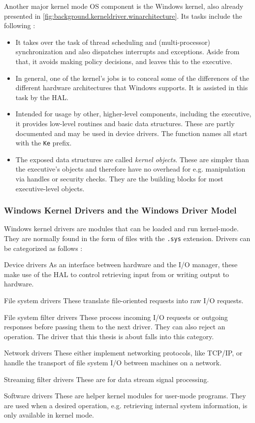 Another major kernel mode OS component is the Windows kernel, also already presented in \autoref{fig:background.kerneldriver.winarchitecture}. Its tasks include the following \cite{Yosifovich2017}:
\begin{itemize}
	\item It takes over the task of thread scheduling and (multi-processor) synchronization and also dispatches interrupts and exceptions. Aside from that, it avoids making policy decisions, and leaves this to the executive.
	\item In general, one of the kernel's jobs is to conceal some of the differences of the different hardware architectures that Windows supports. It is assisted in this task by the HAL.
	\item Intended for usage by other, higher-level components, including the executive, it provides low-level routines and basic data structures. These are partly documented and may be used in device drivers. The function names all start with the \texttt{Ke} prefix.
	\item The exposed data structures are called \emph{kernel objects}. These are simpler than the executive's objects and therefore have no overhead for e.g. manipulation via handles or security checks. They are the building blocks for most executive-level objects.
\end{itemize}

\subsubsection{Windows Kernel Drivers and the Windows Driver Model}
\label{chap:background.kerneldriver.wdm}
Windows kernel drivers are modules that can be loaded and run kernel-mode. They are normally found in the form of files with the \texttt{.sys} extension. Drivers can be categorized as follows \cite{Yosifovich2017}:
\begin{descitemize}
	\item[Device drivers] As an interface between hardware and the I/O manager, these make use of the HAL to control retrieving input from or writing output to hardware.
	\item[File system drivers] These translate file-oriented requests into raw I/O requests.
	\item[File system filter drivers] These process incoming I/O requests or outgoing responses before passing them to the next driver. They can also reject an operation. The driver that this thesis is about falls into this category.
	\item[Network drivers] These either implement networking protocols, like TCP/IP, or handle the transport of file system I/O between machines on a network.
	\item[Streaming filter drivers] These are for data stream signal processing.
	\item[Software drivers] These are helper kernel modules for user-mode programs. They are used when a desired operation, e.g. retrieving internal system information, is only available in kernel mode.
\end{descitemize}


